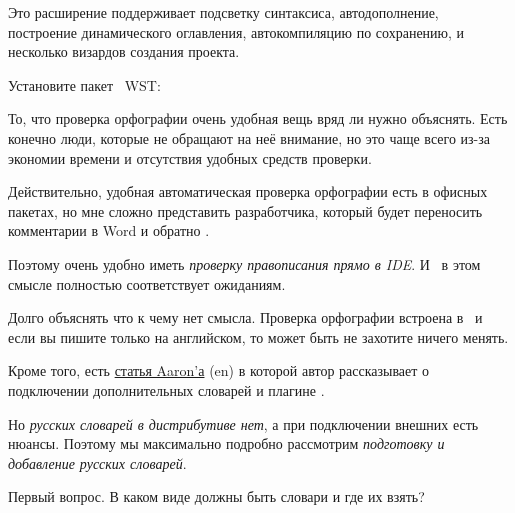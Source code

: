 





Это расширение поддерживает подсветку синтаксиса, автодополнение, построение
динамического оглавления, автокомпиляцию по сохранению, и несколько визардов
создания проекта.


Установите пакет \eclipse\ WST:






То, что проверка орфографии очень удобная вещь вряд ли нужно объяснять. Есть
конечно люди, которые не обращают на неё внимание, но это чаще всего из-за
экономии времени и отсутствия удобных средств проверки.

Действительно, удобная автоматическая проверка орфографии есть в офисных
пакетах, но мне сложно представить разработчика, который будет переносить
комментарии в Word и обратно \smiley.

Поэтому очень удобно иметь \emph{проверку правописания прямо в IDE}. И \eclipse\
в этом смысле полностью соответствует ожиданиям.

Долго объяснять что к чему нет смысла. Проверка орфографии встроена в \eclipse\
и если вы пишите только на английском, то может быть не захотите ничего менять.

Кроме того, есть
\href{http://www.102degrees.com/blog/2007/07/09/spell-checking-in-eclipse-pdt/}{статья
Aaron'а} (en) в которой автор рассказывает о подключении дополнительных словарей
и плагине \file{eSpell}.

Но \emph{русских словарей в дистрибутиве нет}, а при подключении внешних есть
нюансы. Поэтому мы максимально подробно рассмотрим \emph{подготовку и добавление
русских словарей}.

Первый вопрос. В каком виде должны быть словари и где их взять?

